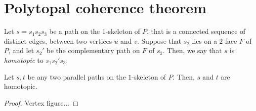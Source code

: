 
\section{Polytopal coherence theorem} 
\label{s:polycoherence}

Let $s=s_1 s_2 s_3$ be a path on the $1$-skeleton of $P$, that is a connected sequence of distinct edges, between two vertices $u$ and $v$.
Suppose that $s_2$ lies on a $2$-face $F$ of $P$, and let $s_2'$ be the complementary path on $F$ of $s_2$. 
Then, we say that $s$ is \emph{homotopic} to $s_1 s_2' s_3$. 


\begin{thm}
    Let $s,t$ be any two parallel paths on the $1$-skeleton of $P$. 
    Then, $s$ and $t$ are homotopic. 
\end{thm}

\begin{proof}
    Vertex figure...
\end{proof}




